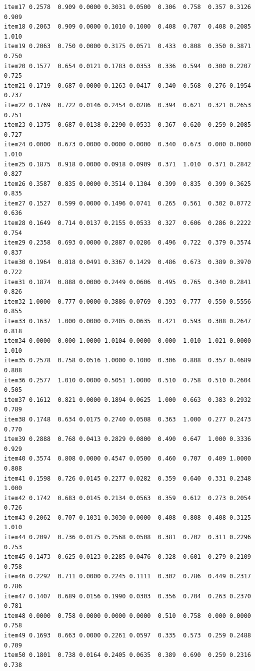 \documentclass[
  a4paper,
]{ltjsbook}
\begin{document}
\begin{verbatim}
item17 0.2578  0.909 0.0000 0.3031 0.0500  0.306  0.758  0.357 0.3126  0.909
item18 0.2063  0.909 0.0000 0.1010 0.1000  0.408  0.707  0.408 0.2085  1.010
item19 0.2063  0.750 0.0000 0.3175 0.0571  0.433  0.808  0.350 0.3871  0.750
item20 0.1577  0.654 0.0121 0.1783 0.0353  0.336  0.594  0.300 0.2207  0.725
item21 0.1719  0.687 0.0000 0.1263 0.0417  0.340  0.568  0.276 0.1954  0.737
item22 0.1769  0.722 0.0146 0.2454 0.0286  0.394  0.621  0.321 0.2653  0.751
item23 0.1375  0.687 0.0138 0.2290 0.0533  0.367  0.620  0.259 0.2085  0.727
item24 0.0000  0.673 0.0000 0.0000 0.0000  0.340  0.673  0.000 0.0000  1.010
item25 0.1875  0.918 0.0000 0.0918 0.0909  0.371  1.010  0.371 0.2842  0.827
item26 0.3587  0.835 0.0000 0.3514 0.1304  0.399  0.835  0.399 0.3625  0.835
item27 0.1527  0.599 0.0000 0.1496 0.0741  0.265  0.561  0.302 0.0772  0.636
item28 0.1649  0.714 0.0137 0.2155 0.0533  0.327  0.606  0.286 0.2222  0.754
item29 0.2358  0.693 0.0000 0.2887 0.0286  0.496  0.722  0.379 0.3574  0.837
item30 0.1964  0.818 0.0491 0.3367 0.1429  0.486  0.673  0.389 0.3970  0.722
item31 0.1874  0.888 0.0000 0.2449 0.0606  0.495  0.765  0.340 0.2841  0.826
item32 1.0000  0.777 0.0000 0.3886 0.0769  0.393  0.777  0.550 0.5556  0.855
item33 0.1637  1.000 0.0000 0.2405 0.0635  0.421  0.593  0.308 0.2647  0.818
item34 0.0000  0.000 1.0000 1.0104 0.0000  0.000  1.010  1.021 0.0000  1.010
item35 0.2578  0.758 0.0516 1.0000 0.1000  0.306  0.808  0.357 0.4689  0.808
item36 0.2577  1.010 0.0000 0.5051 1.0000  0.510  0.758  0.510 0.2604  0.505
item37 0.1612  0.821 0.0000 0.1894 0.0625  1.000  0.663  0.383 0.2932  0.789
item38 0.1748  0.634 0.0175 0.2740 0.0508  0.363  1.000  0.277 0.2473  0.770
item39 0.2888  0.768 0.0413 0.2829 0.0800  0.490  0.647  1.000 0.3336  0.929
item40 0.3574  0.808 0.0000 0.4547 0.0500  0.460  0.707  0.409 1.0000  0.808
item41 0.1598  0.726 0.0145 0.2277 0.0282  0.359  0.640  0.331 0.2348  1.000
item42 0.1742  0.683 0.0145 0.2134 0.0563  0.359  0.612  0.273 0.2054  0.726
item43 0.2062  0.707 0.1031 0.3030 0.0000  0.408  0.808  0.408 0.3125  1.010
item44 0.2097  0.736 0.0175 0.2568 0.0508  0.381  0.702  0.311 0.2296  0.753
item45 0.1473  0.625 0.0123 0.2285 0.0476  0.328  0.601  0.279 0.2109  0.758
item46 0.2292  0.711 0.0000 0.2245 0.1111  0.302  0.786  0.449 0.2317  0.786
item47 0.1407  0.689 0.0156 0.1990 0.0303  0.356  0.704  0.263 0.2370  0.781
item48 0.0000  0.758 0.0000 0.0000 0.0000  0.510  0.758  0.000 0.0000  0.758
item49 0.1693  0.663 0.0000 0.2261 0.0597  0.335  0.573  0.259 0.2488  0.709
item50 0.1801  0.738 0.0164 0.2405 0.0635  0.389  0.690  0.259 0.2316  0.738

\end{verbatim}
\end{document}
